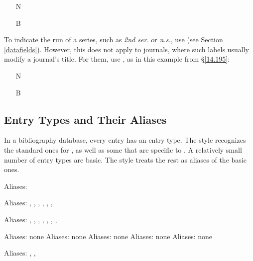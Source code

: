 \documentclass[11pt,letterpaper,oneside]{article}
\begin{document}
\begin{itemize}
\item[N] 

\item[B] 
\end{itemize}

To indicate the run of a series, such as \textit{2nd ser.} or
\textit{n.s.}, use  (see Section
\ref{datafields}). However, this does not apply to journals, where
such labels usually modify a journal's title. For them, use
, as in this example from \S\ref{14.195}:

\begin{itemize}
\item[N] 

\item[B] 
\end{itemize}

\subsection{Entry Types and Their Aliases}

In a bibliography database, every entry has an entry type. The style
recognizes the standard ones for \BibTeX, as well as some that are
specific to \biblatex. A relatively small number of entry types are
basic. The style treats the rest as aliases of the basic ones.

\begin{typelist}\raggedright


Aliases: 


Aliases: , , ,
, , ,


Aliases: , ,
, , ,
, , 

 Aliases: none
 Aliases: none
 Aliases: none
 Aliases: none
 Aliases: none


Aliases: , ,

\end{typelist}
\end{document}
